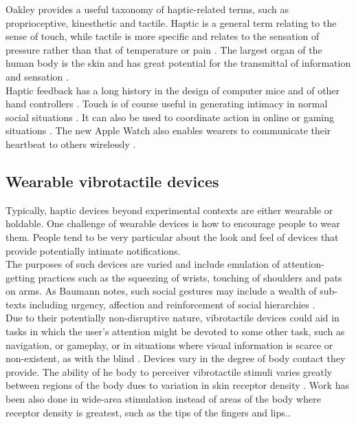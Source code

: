 \documentclass[a4paper, twocolumn]{article}
\begin{document}
Oakley provides a useful taxonomy of haptic-related terms, such as proprioceptive, kinesthetic and tactile. Haptic is a general term relating to the sense of touch, while tactile is more specific and relates to the sensation of pressure rather than that of temperature or pain \cite{oakley2000putting}. The largest organ of the human body is the skin and has great potential for the transmittal of information and sensation \cite{lindeman2006wearable} \cite{brewster2004tactons}.\\

Haptic feedback has a long history in the design of computer mice and of other hand controllers \cite{yang2005novel}. Touch is of course useful in generating intimacy in normal social situations \cite{bronner1982haptic}. It can also be used to coordinate action in online or gaming situations \cite{ho1998experiment}. The new Apple Watch also enables wearers to communicate their heartbeat to others wirelessly \cite{johnson2014literature}.\\

\subsection{Wearable vibrotactile devices}
Typically, haptic devices beyond experimental contexts are either wearable or holdable. One challenge of wearable devices is how to encourage people to wear them. People tend to be very particular about the look and feel of devices that provide potentially intimate notifications.\\ 

The purposes of such devices are varied and include emulation of attention-getting practices such as the squeezing of wrists, touching of shoulders and pats on arms. As Baumann notes, such social gestures may include a wealth of sub-texts including urgency, affection and reinforcement of social hierarchies \cite{baumann2010emulating}.\\

Due to their potentially non-disruptive nature, vibrotactile devices could aid in tasks in which the user's attention might be devoted to some other task, such as navigation, or gameplay, or in situations where visual information is scarce or non-existent, as with the blind \cite{ertan1998wearable}.  Devices vary in the degree of body contact they provide. The ability of he body to perceiver vibrotactile stimuli varies greatly between regions of the body dues to variation in skin receptor density \cite{lindeman2006wearable}. Work has been also done in wide-area stimulation instead of areas of the body where receptor density is greatest, such as the tips of the fingers and lips.\cite{lindeman2004towards}.
\end{document}
